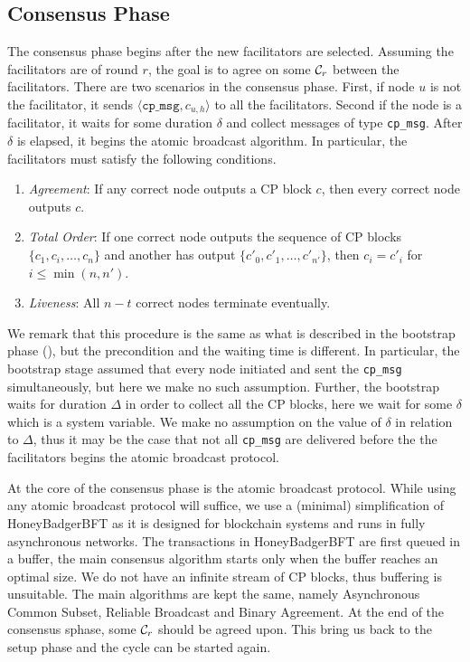\subsection{Consensus Phase}
The consensus phase begins after the new facilitators are selected.
Assuming the facilitators are of round $r$,
the goal is to agree on some $\mathcal{C}_r$ between the facilitators.
There are two scenarios in the consensus phase.
First, if node $u$ is not the facilitator, it sends $\langle \texttt{cp\_msg}, c_{u, h} \rangle$ to all the facilitators.
Second if the node is a facilitator, it waits for some duration $\delta$ and collect messages of type \texttt{cp\_msg}.
After $\delta$ is elapsed, it begins the atomic broadcast algorithm.
In particular, the facilitators must satisfy the following conditions.
\begin{enumerate}
\item \emph{Agreement}: If any correct node outputs a CP block $c$, then every
  correct node outputs $c$.
\item \emph{Total Order}: If one correct node outputs the sequence of CP blocks
  $\{c_1, c_i, \dots, c_n\}$ and another has output $\{c'_0, c'_1, \dots,
  c'_{n'} \}$, then $c_i = c'_i$ for $i \le \min(n, n')$.
\item \emph{Liveness}: All $n - t$ correct nodes terminate eventually.
\end{enumerate}

We remark that this procedure is the same as what is described in the bootstrap phase (),
but the precondition and the waiting time is different.
In particular, the bootstrap stage assumed that every node initiated and sent the \texttt{cp\_msg} simultaneously,
but here we make no such assumption. Further, the bootstrap waits for duration $\Delta$ in order to collect all the CP blocks,
here we wait for some $\delta$ which is a system variable.
We make no assumption on the value of $\delta$ in relation to $\Delta$,
thus it may be the case that not all \texttt{cp\_msg} are delivered before the the facilitators begins the atomic broadcast protocol.

At the core of the consensus phase is the atomic broadcast protocol.
While using any atomic broadcast protocol will suffice,
we use a (minimal) simplification of HoneyBadgerBFT as it is designed for blockchain systems and runs in fully asynchronous networks.
The transactions in HoneyBadgerBFT are first queued in a buffer, the main consensus algorithm starts only when the buffer reaches an optimal size.
We do not have an infinite stream of CP blocks, thus buffering is unsuitable.
The main algorithms are kept the same, namely Asynchronous Common Subset, Reliable Broadcast and Binary Agreement.
At the end of the consensus sphase, some $\mathcal{C}_r$ should be agreed upon.
This bring us back to the setup phase and the cycle can be started again.


